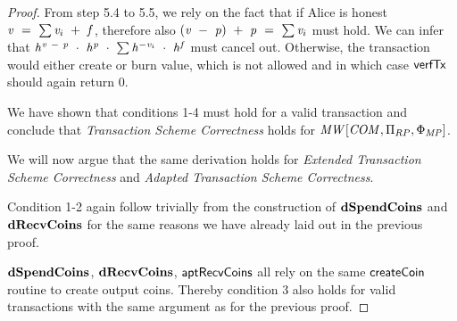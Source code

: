 \begin{proof}
    From step 5.4 to 5.5, we rely on the fact that if Alice is honest $\mathit{v} ~=~ \sum \mathit{v}_i ~+~ \mathit{f}$, therefore also $(\mathit{v} ~-~ \mathit{p}) ~+~ \mathit{p} ~=~ \sum \mathit{v}_i$ must hold.
    We can infer that $\mathit{h}^{\mathit{v} ~-~ \mathit{p}} ~\cdot~ \mathit{h}^{\mathit{p}} ~\cdot~ \sum \mathit{h}^{- \mathit{v}_i} ~\cdot~ \mathit{h}^{\mathit{f}}$ must cancel out.
    Otherwise, the transaction would either create or burn value, which is not allowed and in which case $\mathsf{verfTx}$ should again return 0.

    We have shown that conditions 1-4 must hold for a valid transaction and conclude that \emph{Transaction Scheme Correctness} holds for $\mathit{MW}[\mathit{COM},\Pi_{RP},\Phi_{\mathit{MP}}]$.

    We will now argue that the same derivation holds for \emph{Extended Transaction Scheme Correctness} and \emph{Adapted Transaction Scheme Correctness}.

    Condition 1-2 again follow trivially from the construction of $\mathbf{dSpendCoins}$ and \\$\mathbf{dRecvCoins}$ for the same reasons we have already laid out in the previous proof.

    $\mathbf{dSpendCoins}$, $\mathbf{dRecvCoins}$, $\mathsf{aptRecvCoins}$ all rely on the same $\mathsf{createCoin}$ routine to create output coins.
    Thereby condition 3 also holds for valid transactions with the same argument as for the previous proof.


\end{proof}
